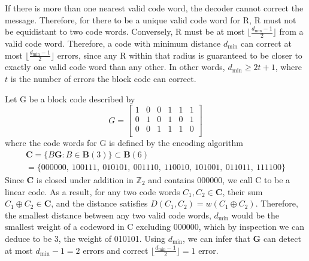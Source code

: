 \documentclass{article}
\begin{document}
If there is more than one nearest valid code word, the decoder cannot correct the message. 
Therefore, for there to be a unique valid code word for R, R must not be equidistant to two code 
words. Conversely, R must be at most \(\lfloor\frac{d_\text{min} - 1}{2}\rfloor\) from a valid code word.
Therefore, a code with minimum distance \(d_\text{min}\) can correct at most 
\(\lfloor\frac{d_\text{min} - 1}{2}\rfloor\) errors, since any R within that radius is guaranteed to be 
closer to exactly one valid code word than any other. In other words, \(d_\text{min} \geq 2t + 1\), where 
\(t\) is the number of errors the block code can correct.

Let G be a block code described by
\[
G = \begin{bmatrix}
    1 & 0 & 0 & 1 & 1 & 1 \\
    0 & 1 & 0 & 1 & 0 & 1 \\
    0 & 0 & 1 & 1 & 1 & 0 \\
\end{bmatrix}
\]
where the code words for G is defined by the encoding algorithm 
\begin{gather*}
\mathbf{C} = \{B\mathbf{G} : B \in \mathbf{B}(3)\} \subset \mathbf{B}(6) \\
           = \{000000,\ 100111,\ 010101,\ 001110,\ 110010,\ 101001,\ 011011,\ 111100\}
\end{gather*}
Since \(\mathbf{C}\) is closed under addition in \(\mathbb{Z}_2\) and contains 000000, we call C to 
be a linear code. As a result, for any two code words \(C_1, C_2 \in \mathbf{C}\), their sum 
\(C_1 \oplus C_2 \in \mathbf{C}\), and the distance satisfies \(D(C_1, C_2) = w(C_1 \oplus C_2)\).
Therefore, the smallest distance between any two valid code words, \(d_\text{min}\) would be the 
smallest weight of a codeword in C excluding 000000, which by inspection we can deduce to be 3, the 
weight of 010101. Using \(d_\text{min}\), we can infer that \(\mathbf{G}\) can detect at most 
\(d_\text{min} - 1 = 2\) errors and correct \(\lfloor\frac{d_\text{min} - 1}{2}\rfloor = 1\)
error.
\end{document}

